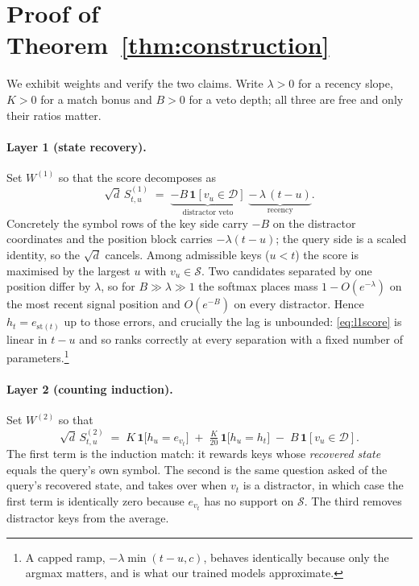 \section{Proof of Theorem~\ref{thm:construction}}
\label{app:construction}

We exhibit weights and verify the two claims. Write $\lambda>0$ for a recency slope, $K>0$ for a
match bonus and $B>0$ for a veto depth; all three are free and only their ratios matter.

\paragraph{Layer 1 (state recovery).}
Set $W^{(1)}$ so that the score decomposes as
\begin{equation}
\sqrt d\,S^{(1)}_{t,u}\;=\;\underbrace{-B\,\mathbf 1[v_u\in\mathcal{D}]}_{\text{distractor veto}}
\;\underbrace{-\,\lambda\,(t-u)}_{\text{recency}} .
\label{eq:l1score}
\end{equation}
Concretely the symbol rows of the key side carry $-B$ on the distractor coordinates and the
position block carries $-\lambda(t-u)$; the query side is a scaled identity, so the
$\sqrt d$ cancels. Among admissible keys ($u<t$) the score is maximised by the largest $u$ with
$v_u\in\mathcal{S}$. Two candidates separated by one position differ by $\lambda$, so for
$B\gg\lambda\gg1$ the softmax places mass $1-O(e^{-\lambda})$ on the most recent signal position
and $O(e^{-B})$ on every distractor. Hence $h_t=e_{\mathrm{st}(t)}$ up to those errors, and
crucially the lag is unbounded: \eqref{eq:l1score} is linear in $t-u$ and so ranks correctly at
every separation with a fixed number of parameters.\footnote{A capped ramp,
$-\lambda\min(t-u,c)$, behaves identically because only the argmax matters, and is what our
trained models approximate.}

\paragraph{Layer 2 (counting induction).}
Set $W^{(2)}$ so that
\begin{equation}
\sqrt d\,S^{(2)}_{t,u}\;=\;K\,\mathbf 1\bigl[h_u=e_{v_t}\bigr]
\;+\;\tfrac{K}{20}\,\mathbf 1\bigl[h_u=h_t\bigr]\;-\;B\,\mathbf 1[v_u\in\mathcal{D}] .
\label{eq:l2score}
\end{equation}
The first term is the induction match: it rewards keys whose \emph{recovered state} equals the
query's own symbol. The second is the same question asked of the query's recovered state, and
takes over when $v_t$ is a distractor, in which case the first term is identically zero because
$e_{v_t}$ has no support on $\mathcal{S}$. The third removes distractor keys from the average.

